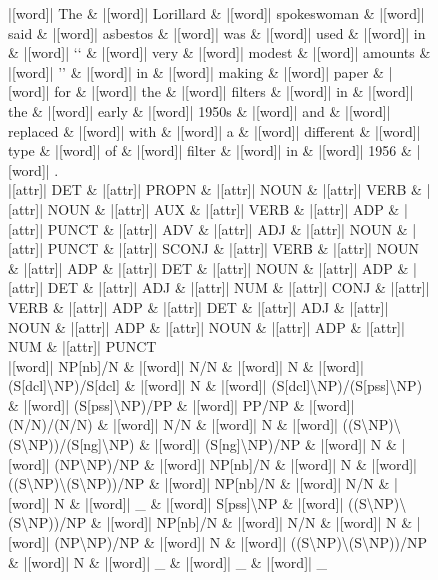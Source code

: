 \documentclass[10pt,a4paper]{article}
\begin{document}
\begin{figure}[h]
{\begin{dependency}[theme = simple]
\begin{deptext}[column sep=1em, row sep=0.1em]
|[word]| The \& |[word]| Lorillard \& |[word]| spokeswoman \& |[word]| said \& |[word]| asbestos \& |[word]| was \& |[word]| used \& |[word]| in \& |[word]| {}`{}` \& |[word]| very \& |[word]| modest \& |[word]| amounts \& |[word]| '' \& |[word]| in \& |[word]| making \& |[word]| paper \& |[word]| for \& |[word]| the \& |[word]| filters \& |[word]| in \& |[word]| the \& |[word]| early \& |[word]| 1950s \& |[word]| and \& |[word]| replaced \& |[word]| with \& |[word]| a \& |[word]| different \& |[word]| type \& |[word]| of \& |[word]| filter \& |[word]| in \& |[word]| 1956 \& |[word]| . \\
|[attr]| DET \& |[attr]| PROPN \& |[attr]| NOUN \& |[attr]| VERB \& |[attr]| NOUN \& |[attr]| AUX \& |[attr]| VERB \& |[attr]| ADP \& |[attr]| PUNCT \& |[attr]| ADV \& |[attr]| ADJ \& |[attr]| NOUN \& |[attr]| PUNCT \& |[attr]| SCONJ \& |[attr]| VERB \& |[attr]| NOUN \& |[attr]| ADP \& |[attr]| DET \& |[attr]| NOUN \& |[attr]| ADP \& |[attr]| DET \& |[attr]| ADJ \& |[attr]| NUM \& |[attr]| CONJ \& |[attr]| VERB \& |[attr]| ADP \& |[attr]| DET \& |[attr]| ADJ \& |[attr]| NOUN \& |[attr]| ADP \& |[attr]| NOUN \& |[attr]| ADP \& |[attr]| NUM \& |[attr]| PUNCT \\
|[word]| NP{[}nb{]}/N \& |[word]| N/N \& |[word]| N \& |[word]| (S{[}dcl{]}\textbackslash{}NP)/S{[}dcl{]} \& |[word]| N \& |[word]| (S{[}dcl{]}\textbackslash{}NP)/(S{[}pss{]}\textbackslash{}NP) \& |[word]| (S{[}pss{]}\textbackslash{}NP)/PP \& |[word]| PP/NP \& |[word]| (N/N)/(N/N) \& |[word]| N/N \& |[word]| N \& |[word]| ((S\textbackslash{}NP)\textbackslash{}(S\textbackslash{}NP))/(S{[}ng{]}\textbackslash{}NP) \& |[word]| (S{[}ng{]}\textbackslash{}NP)/NP \& |[word]| N \& |[word]| (NP\textbackslash{}NP)/NP \& |[word]| NP{[}nb{]}/N \& |[word]| N \& |[word]| ((S\textbackslash{}NP)\textbackslash{}(S\textbackslash{}NP))/NP \& |[word]| NP{[}nb{]}/N \& |[word]| N/N \& |[word]| N \& |[word]| \_ \& |[word]| S{[}pss{]}\textbackslash{}NP \& |[word]| ((S\textbackslash{}NP)\textbackslash{}(S\textbackslash{}NP))/NP \& |[word]| NP{[}nb{]}/N \& |[word]| N/N \& |[word]| N \& |[word]| (NP\textbackslash{}NP)/NP \& |[word]| N \& |[word]| ((S\textbackslash{}NP)\textbackslash{}(S\textbackslash{}NP))/NP \& |[word]| N \& |[word]| \_ \& |[word]| \_ \& |[word]| \_ \\
\end{deptext}



\end{dependency}}
\end{figure}
\end{document}
